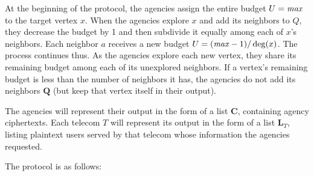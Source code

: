 At the beginning of the protocol, the agencies assign the entire budget $U=\mathit{max}$ to the target vertex $x$. When the agencies explore $x$ and add its neighbors to $Q$, they decrease the budget by 1 and then subdivide it equally among each of $x$'s neighbors. Each neighbor $a$ receives a new budget $U=(\mathit{max}-1)/\operatorname{deg}(x)$. The process continues thus. As the agencies explore each new vertex, they share its remaining budget among each of its unexplored neighbors. If a vertex's remaining budget is less than the number of neighbors it has, the agencies do not add its neighbors $\mathbf{Q}$ (but keep that vertex itself in their output).

The agencies will represent their output in the form of a list $\mathbf{C}$, containing agency ciphertexts. Each telecom $T$ will represent its output in the form of a list $\mathbf{L}_T$, listing plaintext users served by that telecom whose information the agencies requested.

The protocol is as follows:

